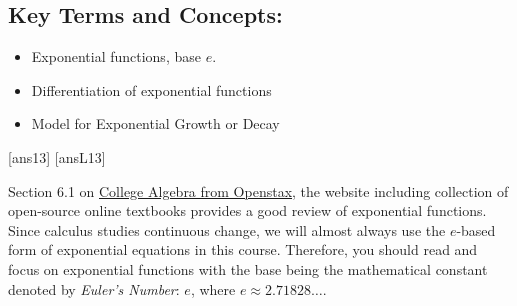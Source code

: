 \begin{framed}
\begin{itemize}
\begin{itemize}
    \end{itemize}

\end{itemize}
\subsection*{Key Terms and Concepts:} 

\begin{multicols}{2}
\begin{itemize}
    \item Exponential functions, base $e$.
    \item Differentiation of exponential functions
    \item Model for Exponential Growth or Decay
    
\end{itemize}
\end{multicols}
\end{framed}
\newpage
[ans13]
[ansL13]

\noindent Section 6.1 on \href{https://openstax.org/books/college-algebra/pages/6-1-exponential-functions}{College Algebra from Openstax}, the website including collection of open-source online textbooks provides a good review of exponential functions. Since calculus studies continuous change, we will almost always use the $e$-based form of exponential equations in this course.   Therefore, you should read and focus on exponential functions with the base being the mathematical constant denoted by \emph{Euler's Number}: $e$, where $e\approx 2.71828…$. 

